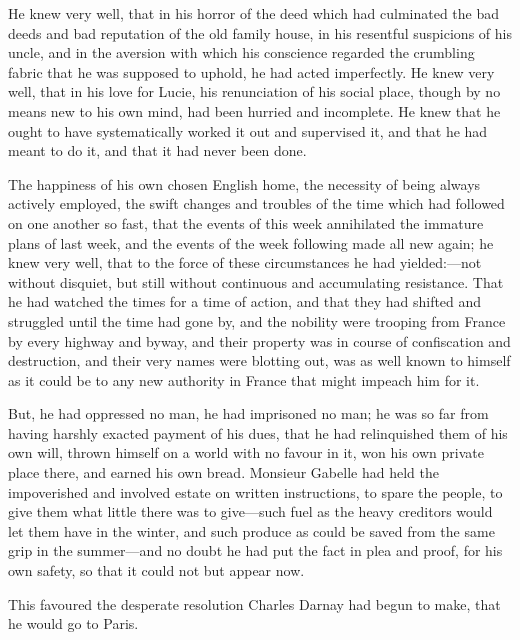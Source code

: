 He knew very well, that in his horror of the deed which had culminated
the bad deeds and bad reputation of the old family house, in his
resentful suspicions of his uncle, and in the aversion with which his
conscience regarded the crumbling fabric that he was supposed to
uphold, he had acted imperfectly.  He knew very well, that in his love
for Lucie, his renunciation of his social place, though by no means
new to his own mind, had been hurried and incomplete.  He knew that
he ought to have systematically worked it out and supervised it, and
that he had meant to do it, and that it had never been done.

The happiness of his own chosen English home, the necessity of being
always actively employed, the swift changes and troubles of the time
which had followed on one another so fast, that the events of this
week annihilated the immature plans of last week, and the events of
the week following made all new again; he knew very well, that to the
force of these circumstances he had yielded:---not without disquiet,
but still without continuous and accumulating resistance.  That he
had watched the times for a time of action, and that they had shifted
and struggled until the time had gone by, and the nobility were
trooping from France by every highway and byway, and their property
was in course of confiscation and destruction, and their very names
were blotting out, was as well known to himself as it could be to any
new authority in France that might impeach him for it.

But, he had oppressed no man, he had imprisoned no man; he was so far
from having harshly exacted payment of his dues, that he had
relinquished them of his own will, thrown himself on a world with no
favour in it, won his own private place there, and earned his own
bread.  Monsieur Gabelle had held the impoverished and involved estate
on written instructions, to spare the people, to give them what little
there was to give---such fuel as the heavy creditors would let them
have in the winter, and such produce as could be saved from the same
grip in the summer---and no doubt he had put the fact in plea and proof,
for his own safety, so that it could not but appear now.

This favoured the desperate resolution Charles Darnay had begun to make,
that he would go to Paris.

